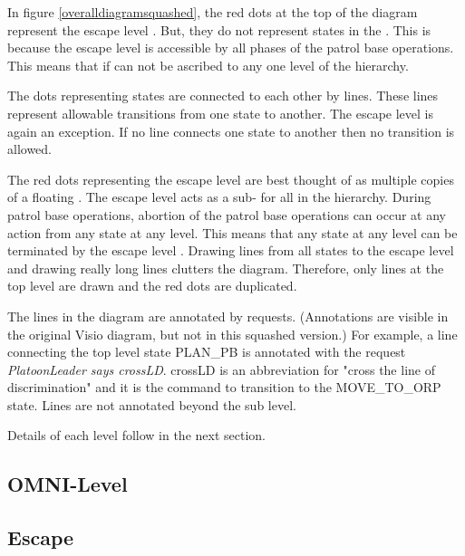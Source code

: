 \documentclass[../../main/main.tex]{subfiles}
\begin{document}
In figure \ref{overalldiagramsquashed}, the red dots at the top of the diagram represent the escape level .  But, they do not represent states in the .  This is because the escape level   is accessible by all phases of the patrol base operations.  This means that if can not be ascribed to any one level of the hierarchy. 


The dots representing states are connected to each other by lines.  These lines represent allowable transitions from one state to another.  The escape level is again an exception.  If no line connects one state to another then no transition is allowed.  

The red dots representing the escape level  are best thought of as multiple copies of a floating .  The escape level  acts as a sub- for all  in the hierarchy.  During patrol base operations, abortion of the patrol base operations can occur at any action from any state at any level.  This means that any state at any level can be terminated by the escape level .  Drawing lines from all states to the escape level  and drawing really long lines clutters the diagram.  Therefore, only lines at the top level are drawn and the red dots are duplicated.

 The lines in the diagram are annotated by  requests.  (Annotations are visible in the original Visio diagram, but not in this squashed version.)  For example, a line connecting the top level state PLAN_PB is annotated with the request \textit{PlatoonLeader says crossLD}.  crossLD is an abbreviation for "cross the line of discrimination" and it is the command to transition to the MOVE_TO_ORP state.    Lines are not annotated beyond the sub level.

Details of each level follow in the next section.  
 

\subsection{OMNI-Level}\label{ssec:omnilevel}

\subsection{Escape}\label{ssec:escape}
\end{document}
